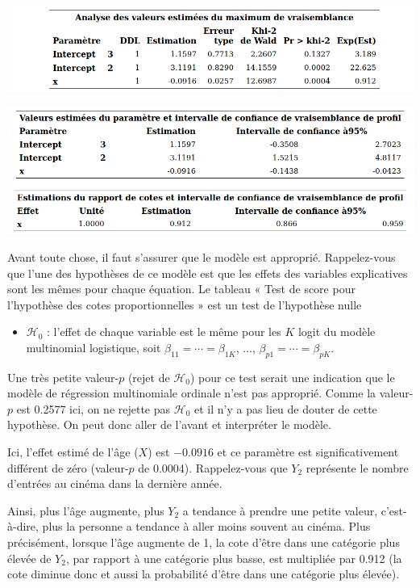 \documentclass[
  11pt,
  letterpaper,
]{book}
\providecommand{\tightlist}{%
  \setlength{\itemsep}{0pt}\setlength{\parskip}{0pt}}
\theoremstyle{definition}
\theoremstyle{definition}
\theoremstyle{definition}
\theoremstyle{remark}
\begin{document}
\begin{center}\includegraphics[width=0.8\linewidth]{figures/03-logistic-e29} \end{center}

\begin{center}\includegraphics[width=0.8\linewidth]{figures/03-logistic-e30} \end{center}

Avant toute chose, il faut s'assurer que le modèle est approprié. Rappelez-vous que l'une des hypothèses de ce modèle est que les effets des variables explicatives sont les mêmes pour chaque équation. Le tableau « Test de score pour l'hypothèse des cotes proportionnelles » est un test de l'hypothèse nulle

\begin{itemize}
\tightlist
\item
  \(\mathcal{H}_0\) : l'effet de chaque variable est le même pour les \(K\) logit du modèle multinomial logistique, soit \(\beta_{11} = \cdots =\beta_{1K}\), \(\ldots\), \(\beta_{p1} = \cdots =\beta_{pK}\).
\end{itemize}

Une très petite valeur-\(p\) (rejet de \(\mathcal{H}_0\)) pour ce test serait une indication que le modèle de régression multinomiale ordinale n'est pas approprié. Comme la valeur-\(p\) est 0.2577 ici, on ne rejette pas \(\mathcal{H}_0\) et il n'y a pas lieu de douter de cette hypothèse. On peut donc aller de l'avant et interpréter le modèle.

Ici, l'effet estimé de l'âge (\(X\)) est \(-{0.0916}\) et ce paramètre est significativement différent de zéro (valeur-\(p\) de 0.0004). Rappelez-vous que \(Y_2\) représente le nombre d'entrées au cinéma dans la dernière année.

Ainsi, plus l'âge augmente, plus \(Y_2\) a tendance à prendre une petite valeur, c'est-à-dire, plus la personne a tendance à aller moins souvent au cinéma. Plus précisément, lorsque l'âge augmente de 1, la cote d'être dans une catégorie plus élevée de \(Y_2\), par rapport à une catégorie plus basse, est multipliée par 0.912 (la cote diminue donc et aussi la probabilité d'être dans une catégorie plus élevée).
\end{document}

